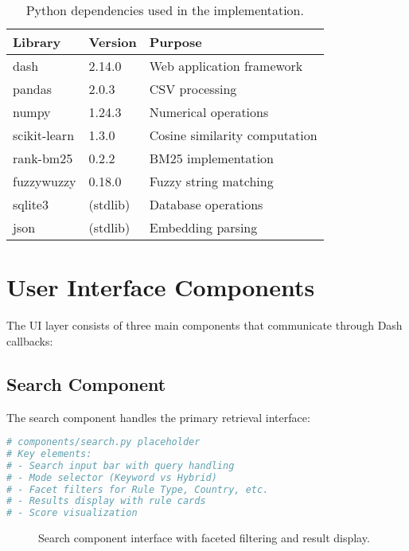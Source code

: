 \begin{table}[ht]
\centering
\begin{tabular}{lll}
\toprule
\textbf{Library} & \textbf{Version} & \textbf{Purpose} \\
\midrule
dash & 2.14.0 & Web application framework \\
pandas & 2.0.3 & CSV processing \\
numpy & 1.24.3 & Numerical operations \\
scikit-learn & 1.3.0 & Cosine similarity computation \\
rank-bm25 & 0.2.2 & BM25 implementation \\
fuzzywuzzy & 0.18.0 & Fuzzy string matching \\
sqlite3 & (stdlib) & Database operations \\
json & (stdlib) & Embedding parsing \\
\bottomrule
\end{tabular}
\caption{Python dependencies used in the implementation.}
\label{tab:dependencies}
\end{table}

\section{User Interface Components}

The UI layer consists of three main components that communicate through Dash callbacks:

\subsection{Search Component}

The search component handles the primary retrieval interface:

\begin{lstlisting}[language=Python, caption={Search component structure}, label={lst:search-component}]
# components/search.py placeholder
# Key elements:
# - Search input bar with query handling
# - Mode selector (Keyword vs Hybrid)
# - Facet filters for Rule Type, Country, etc.
# - Results display with rule cards
# - Score visualization
\end{lstlisting}

\begin{figure}[ht]
\centering
{}
\caption{Search component interface with faceted filtering and result display.}
\label{fig:search-interface}
\end{figure}

